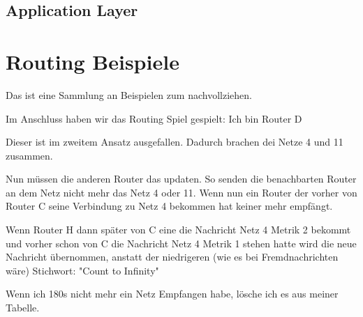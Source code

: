 \documentclass[a4paper]{article}
\begin{document}
\subsection{Application Layer} %



\section{Routing Beispiele}

Das ist eine Sammlung an Beispielen zum nachvollziehen.

Im Anschluss haben wir das Routing Spiel gespielt: Ich bin Router D

Dieser ist im zweitem Ansatz ausgefallen. Dadurch brachen dei Netze 4 und 11 zusammen.

Nun müssen die anderen Router das updaten. So senden die benachbarten Router an dem Netz nicht mehr das Netz 4 oder 11. Wenn nun ein Router der vorher von Router C seine Verbindung zu Netz 4 bekommen hat keiner mehr empfängt.

Wenn Router H dann später von C eine die Nachricht Netz 4 Metrik 2 bekommt und vorher schon von C die Nachricht Netz 4 Metrik 1 stehen hatte wird die neue Nachricht übernommen, anstatt der niedrigeren (wie es bei Fremdnachrichten wäre) Stichwort: "Count to Infinity"

Wenn ich 180s nicht mehr ein Netz Empfangen habe, lösche ich es aus meiner Tabelle.
\end{document}
